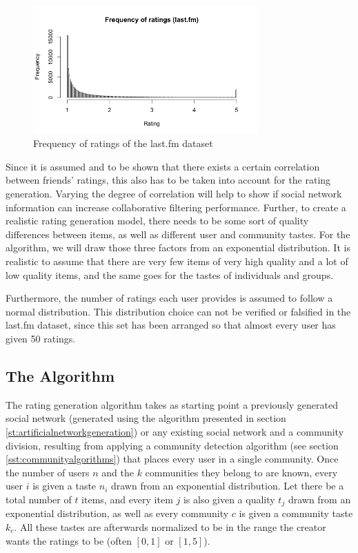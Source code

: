 \begin{figure}[!ht]
\centering
\includegraphics[width=325px]{./3-artificialdata/figures/FrequencyOfRatings_Lastfm.png}
\caption{Frequency of ratings of the last.fm dataset}
\label{f:frequencyofratings}
\end{figure}

Since it is assumed and to be shown that there exists a certain correlation between friends' ratings, this also has to be taken into account for the rating generation. Varying the degree of correlation will help to show if social network information can increase collaborative filtering performance. Further, to create a realistic rating generation model, there needs to be some sort of quality differences between items, as well as different user and community tastes. For the algorithm, we will draw those three factors from an exponential distribution. It is realistic to assume that there are very few items of very high quality and a lot of low quality items, and the same goes for the tastes of individuals and groups.

Furthermore, the number of ratings each user provides is assumed to follow a normal distribution. This distribution choice can not be verified or falsified in the last.fm dataset, since this set has been arranged so that almost every user has given 50 ratings.

\subsection{The Algorithm}
\label{sst:thealgorithm} The rating generation algorithm takes as starting point a previously generated social network (generated using the algorithm presented in section \ref{st:artificialnetworkgeneration}) or any existing social network and a community division, resulting from applying a community detection algorithm (see section \ref{sst:communityalgorithms}) that places every user in a single community. Once the number of users $n$ and the $k$ communities they belong to are known, every user $i$ is given a taste $n_i$ drawn from an exponential distribution. Let there be a total number of $t$ items, and every item $j$ is also given a quality $t_j$ drawn from an exponential distribution, as well as every community $c$ is given a community taste $k_c$. All these tastes are afterwards normalized to be in the range the creator wants the ratings to be (often $[0,1]$ or $[1,5]$).

